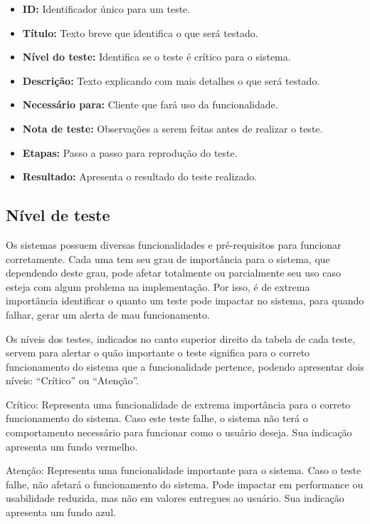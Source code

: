\documentclass[
	12pt,				%
	oneside,			%
	a4paper,			%
	brazil				%
]{abntex2}
\begin{document}
\begin{apendicesenv}
\begin{table}[H]
\end{table}
\egroup

\begin{itemize}

\item \textbf{ID:} Identificador único para um teste.
\item \textbf{Título: }Texto breve que identifica o que será testado.
\item \textbf{Nível do teste:} Identifica se o teste é crítico para o sistema.
\item \textbf{Descrição:} Texto explicando com mais detalhes o que será testado.
\item \textbf{Necessário para:} Cliente que fará uso da funcionalidade.
\item \textbf{Nota de teste:} Observações a serem feitas antes de realizar o teste.
\item \textbf{Etapas:} Passo a passo para reprodução do teste.
\item \textbf{Resultado:} Apresenta o resultado do teste realizado.

\end{itemize}

\newpage

\subsection*{Nível de teste}

Os sistemas possuem diversas funcionalidades e pré-requisitos para funcionar corretamente. Cada uma tem seu grau de importância para o sistema, que dependendo deste grau, pode afetar totalmente ou parcialmente seu uso caso esteja com algum problema na implementação. Por isso, é de extrema importância identificar o quanto um teste pode impactar no sistema, para quando falhar, gerar um alerta de mau funcionamento.

Os níveis dos testes, indicados no canto superior direito da tabela de cada teste, servem para alertar o quão importante o teste significa para o correto funcionamento do sistema que a funcionalidade pertence, podendo apresentar dois níveis: “Crítico” ou “Atenção”.

Crítico: Representa uma funcionalidade de extrema importância para o correto funcionamento do sistema. Caso este teste falhe, o sistema não terá o comportamento necessário para funcionar como o usuário deseja. Sua indicação apresenta um fundo vermelho. 

Atenção: Representa uma funcionalidade importante para o sistema. Caso o teste falhe, não afetará o funcionamento do sistema. Pode impactar em performance ou usabilidade reduzida, mas não em valores entregues ao usuário. Sua indicação apresenta um fundo azul.


\end{apendicesenv}
\end{document}
